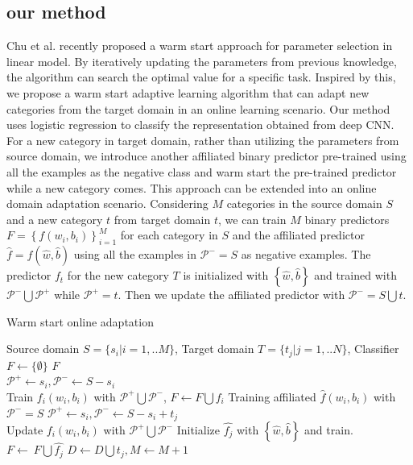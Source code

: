 \subsection{our method}
Chu et al. recently proposed a warm start approach for parameter selection in linear model. By iteratively updating the parameters from previous knowledge, the algorithm can search the optimal value for a specific task\cite{chuwarm}. Inspired by this, we propose a warm start adaptive learning algorithm that can adapt new categories from the target domain in an online learning scenario. Our method uses logistic regression to classify the representation obtained from deep CNN. For a new category in target domain, rather than utilizing the parameters from source domain, we introduce another affiliated binary predictor pre-trained using all the examples as the negative class and warm start the pre-trained predictor while a new category comes. This approach can be extended into an online domain adaptation scenario. Considering $M$ categories in the source domain $S$ and a new category $t$ from target domain $t$, we can train $M$ binary predictors $F=\left\{ {{f}\left( {{w_i},{b_i}} \right)} \right\}_{i = 1}^M$ for each category in $S$ and the affiliated predictor $\hat{f}=f(\hat{w},\hat{b})$ using all the examples in $\mathcal{P^-}=S$ as negative examples. The predictor $f_t$ for the new category $T$ is initialized with $\left\{\hat{w},\hat{b}\right\}$ and trained with $\mathcal{P^-}\bigcup\mathcal{P^+}$ while $\mathcal{P^+}=t$. Then we update the affiliated predictor with $\mathcal{P^-}=S\bigcup t$.
\begin{algorithm}
  \caption{Warm start online adaptation}\label{algo:ws}
  \begin{algorithmic}[1]
    \REQUIRE Source domain $S = \{ {s_i}|i = 1,..M\} $, Target domain $T = \{ {t_j}|j = 1,..N\} $, Classifier $F\leftarrow \{\emptyset\}$
    \ENSURE $F$\\
         \STATE $\mathcal{P^+}\leftarrow s_i, \mathcal{P^-}\leftarrow S-s_i$\\
          Train ${{f_i}\left( {{w_i},{b_i}} \right)}$ with $\mathcal{P^+}\bigcup\mathcal{P^-}$, $F\leftarrow F\bigcup f_i$
    \ENDFOR
    \STATE Training affiliated $\hat{f}\left( {{w_i},{b_i}} \right)$ with $\mathcal{P^-}=S$
             \STATE $\mathcal{P^+}\leftarrow s_i, \mathcal{P^-}\leftarrow S-s_i+t_j$ \\
              Update ${{f_i}\left( {{w_i},{b_i}} \right)}$ with $\mathcal{P^+}\bigcup\mathcal{P^-}$
        \ENDFOR
        \STATE Initialize $\hat{f_j}$ with $\left\{\hat{w},\hat{b}\right\}$ and train.
        \STATE $F\leftarrow\ F\bigcup \hat{f_j}$
        \STATE $D\leftarrow D\bigcup t_j, M\leftarrow M+1$
     \ENDWHILE
  \end{algorithmic}
\end{algorithm}

